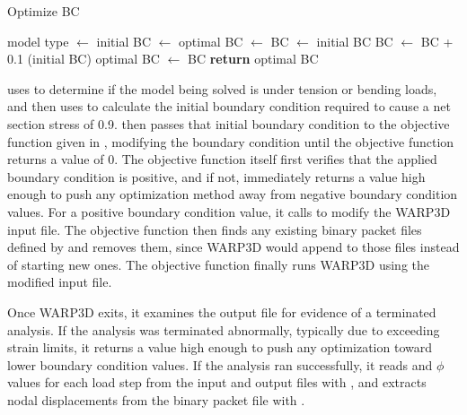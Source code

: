 \begin{algorithm}[tbp]
  \caption{Optimize BC}
  \label{alg:optimize_bc}
  \begin{algorithmic}
    \State {}
    \State model type $\gets$ 
    \State initial BC $\gets$ 
      \State optimal BC $\gets$ 
      \State {}
    \Else
      \State BC $\gets$ initial BC
        \State {}
        \State BC $\gets$ BC + 0.1 (initial BC)
      \EndWhile
      \State optimal BC $\gets$ BC
    \EndIf
    \State \textbf{return} optimal BC
    \EndProcedure
  \end{algorithmic}
\end{algorithm}

 uses  to determine if the model being solved is under tension or bending loads, and then uses  to calculate the initial boundary condition required to cause a net section stress of 0.9\Sys.
 then passes that initial boundary condition to the objective function given in , modifying the boundary condition until the objective function returns a value of 0.
The objective function itself first verifies that the applied boundary condition is positive, and if not, immediately returns a value high enough to push any optimization method away from negative boundary condition values.
For a positive boundary condition value, it calls  to modify the WARP3D input file.
The objective function then finds any existing binary packet files defined by  and removes them, since WARP3D would append to those files instead of starting new ones.
The objective function finally runs WARP3D using the modified input file.

Once WARP3D exits, it examines the output file for evidence of a terminated analysis.
If the analysis was terminated abnormally, typically due to exceeding strain limits, it returns a value high enough to push any optimization toward lower boundary condition values.
If the analysis ran successfully, it reads \J and \(\phi\) values for each load step from the input and output files with , and extracts nodal displacements from the binary packet file with .

